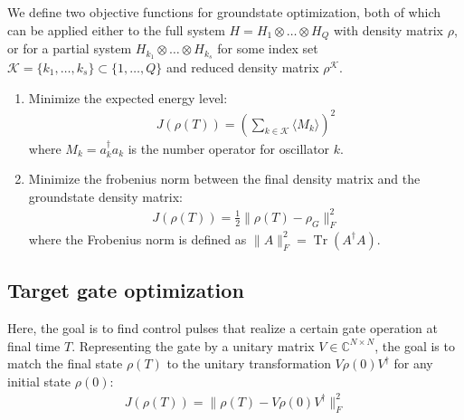\documentclass[letterpaper]{article}
\DeclareMathOperator{\Tr}{Tr}
\newcommand{\C}{\mathds{C}}
\begin{document}
We define two objective functions for groundstate optimization, both of which can be applied either to the full system $H = H_1\otimes \dots \otimes H_Q$ with density matrix $\rho$, or for a partial system $H_{k_1}\otimes \dots \otimes H_{k_s}$ for some index set $\mathcal{K}=\{k_1,\dots,k_s\}\subset \{1,\dots,Q\}$ and reduced density matrix $\rho^{\mathcal{K}}$.
\begin{enumerate}
  \item Minimize the expected energy level:
    \begin{align}
      J(\rho(T)) = \left(\sum_{k\in \mathcal{K}}\langle M_k \rangle \right)^2
    \end{align}
    where $M_k = a_k^\dag a_k$ is the number operator for oscillator $k$. 
  \item Minimize the frobenius norm between the final density matrix and the groundstate density matrix:
    \begin{align}
      J(\rho(T)) = \frac 12 \| \rho(T) - \rho_G \|^2_F 
    \end{align}
    where the Frobenius norm is defined as $\|A\|^2_F = \Tr(A^{\dagger}A)$.
\end{enumerate}

\subsection{Target gate optimization}

Here, the goal is to find control pulses that realize a certain gate operation at final time $T$. Representing the gate by a unitary matrix $V\in \C^{N\times N}$, the goal is to match the final state $\rho(T)$ to the unitary transformation $V\rho(0)V^{\dagger}$ for any initial state $\rho(0)$:
\begin{align}
  J(\rho(T)) = \| \rho(T) - V\rho(0)V^{\dagger} \|^2_F 
\end{align} 
\end{document}
